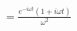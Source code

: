 \documentclass[preview]{standalone}
\begin{document}
\begin{align*}
&=\frac{e^{-i\omega t}(1+i\omega t)}{\omega^{2}}
\end{align*}
\end{document}

